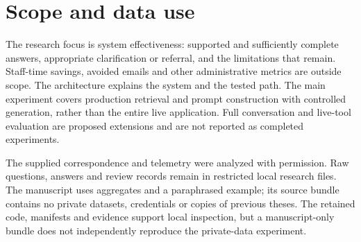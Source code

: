 \section*{Scope and data use}

The research focus is system effectiveness: supported and sufficiently complete answers, appropriate clarification or referral, and the limitations that remain. Staff-time savings, avoided emails and other administrative metrics are outside scope. The architecture explains the system and the tested path. The main experiment covers production retrieval and prompt construction with controlled generation, rather than the entire live application. Full conversation and live-tool evaluation are proposed extensions and are not reported as completed experiments.

The supplied correspondence and telemetry were analyzed with permission. Raw questions, answers and review records remain in restricted local research files. The manuscript uses aggregates and a paraphrased example; its source bundle contains no private datasets, credentials or copies of previous theses. The retained code, manifests and evidence support local inspection, but a manuscript-only bundle does not independently reproduce the private-data experiment.
